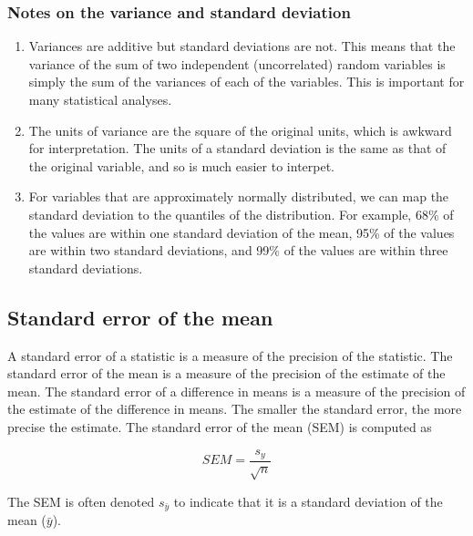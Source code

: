 \documentclass[]{book}
\providecommand{\tightlist}{%
  \setlength{\itemsep}{0pt}\setlength{\parskip}{0pt}}
\begin{document}
\hypertarget{notes-on-the-variance-and-standard-deviation}{%
\subsubsection{Notes on the variance and standard deviation}\label{notes-on-the-variance-and-standard-deviation}}

\begin{enumerate}
\def\labelenumi{\arabic{enumi}.}
\tightlist
\item
  Variances are additive but standard deviations are not. This means that the variance of the sum of two independent (uncorrelated) random variables is simply the sum of the variances of each of the variables. This is important for many statistical analyses.
\item
  The units of variance are the square of the original units, which is awkward for interpretation. The units of a standard deviation is the same as that of the original variable, and so is much easier to interpet.
\item
  For variables that are approximately normally distributed, we can map the standard deviation to the quantiles of the distribution. For example, 68\% of the values are within one standard deviation of the mean, 95\% of the values are within two standard deviations, and 99\% of the values are within three standard deviations.
\end{enumerate}

\hypertarget{standard-error-of-the-mean}{%
\subsection{Standard error of the mean}\label{standard-error-of-the-mean}}

A standard error of a statistic is a measure of the precision of the statistic. The standard error of the mean is a measure of the precision of the estimate of the mean. The standard error of a difference in means is a measure of the precision of the estimate of the difference in means. The smaller the standard error, the more precise the estimate. The standard error of the mean (SEM) is computed as

\begin{equation}
SEM = \frac{s_y}{\sqrt{n}}
\label{eq:se}
\end{equation}

The SEM is often denoted \(s_{\bar{y}}\) to indicate that it is a standard deviation of the mean (\(\bar{y}\)).
\end{document}

